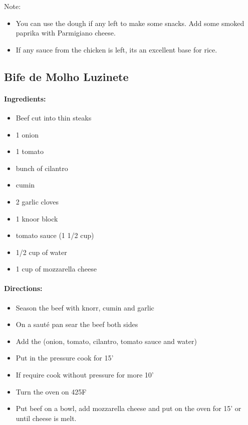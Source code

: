 \documentclass{article}
\begin{document}
Note:

\begin{itemize}
\item You can use the dough if any left to make some snacks. Add some smoked paprika with Parmigiano cheese.
\item If any sauce from the chicken is left, its an excellent base for rice.
\end{itemize}


 

\subsection{Bife de Molho Luzinete}

\paragraph{Ingredients:}

\begin{itemize}
	\item Beef cut into thin steaks
	\item 1 onion
	\item 1 tomato
	\item bunch of cilantro
	\item cumin
	\item 2 garlic cloves
	\item 1 knoor block
	\item tomato sauce (1 1/2 cup)
	\item 1/2 cup of water
	\item 1 cup of mozzarella cheese
\end{itemize}

\paragraph{Directions:}
\begin{itemize}
	\item Season the beef with knorr, cumin and garlic
	\item On a sauté pan sear the beef both sides
	\item Add the (onion, tomato, cilantro, tomato sauce and water)
	\item Put in the pressure cook for 15'
	\item If require cook without pressure for more 10'
	\item Turn the oven on 425F
	\item Put beef on a bowl, add mozzarella cheese and put on the oven for 15' or until cheese is melt.
\end{itemize}
\end{document}
